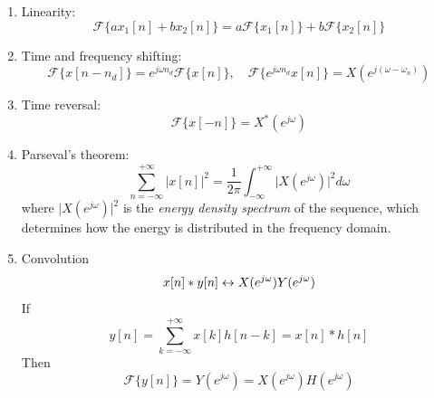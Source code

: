 \begin{enumerate}
    \item Linearity:
    \begin{equation}
        \mathcal{F}\{ax_{1}[n]+bx_{2}[n]\} = a \mathcal{F}\{x_{1}[n]\} + b \mathcal{F}\{x_{2}[n]\}
    \end{equation}

    \item Time and frequency shifting:
    \begin{equation}
        \mathcal{F}\{x[n-n_d]\} = e^{j\omega n_d} \mathcal{F}\{x[n]\}, \quad 
        \mathcal{F}\{e^{j\omega n_d} x[n]\} = X(e^{j(\omega-\omega_n)})
    \end{equation}

    \item Time reversal:
    \begin{equation}
        \mathcal{F}\{x[-n]\} = X^{*}(e^{j\omega})
    \end{equation}

    \item Parseval's theorem:
    \begin{equation}
        \sum_{n=-\infty}^{+\infty} \lvert x[n] \rvert^2 =\frac{1}{2\pi} \int_{-\infty}^{+\infty} \lvert X(e^{j\omega}) \rvert^2 d\omega 
    \end{equation}
    where $\lvert X(e^{j\omega}) \rvert^2$ is the \textit{energy density spectrum} of the sequence, which determines how the energy is distributed in the frequency domain.
    
    \item Convolution
    \begin{equation}
        x[n] * y[n] \leftrightarrow X(e^{j\omega}) Y(e^{j\omega})
    \end{equation}
    If 
    \[
        y[n] = \sum_{k=-\infty}^{+\infty} x[k] h[n-k] = x[n] * h[n]
    \]
    Then
    \[
        \mathcal{F} \{y[n]\} = Y(e^{j\omega}) = X(e^{j\omega})H(e^{j\omega})
    \]  
\end{enumerate}

